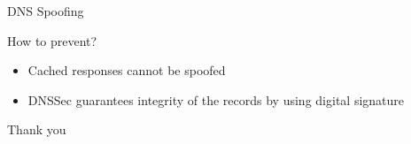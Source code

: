 \documentclass{beamer}
\begin{document}
\begin{frame}{DNS Spoofing}
  \begin{block}{How to prevent?}
  \pause
  \begin{itemize}
    \item Cached responses cannot be spoofed
    \item DNSSec guarantees integrity of the records by using digital signature
  \end{itemize}
  \end{block}
\end{frame}

\begin{frame}{Thank you}
\end{frame}
\end{document}
